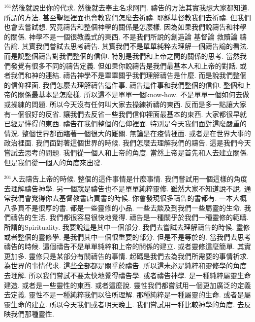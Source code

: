 \documentclass{book}
\begin{document}
$^{161}$然後就說出你的代求.
然後就去奉主名求阿門.
禱告的方法其實我想大家都知道.
所謂的方法.
甚至聖經裡面也會教我們怎麼去祈禱.
耶穌基督教我們去祈禱.
但我們也會去嘗試想.
究竟禱告和整個神學的關係是怎麼樣.
因為如果我們說禱告和神學的關係.
神學不是一個很教義式的東西.
不是我們所說的創造論 基督論 救贖論 禱告論.
其實我們嘗試去思考禱告.
其實我們不是單單純粹去理解一個禱告論的看法.
而是說整個禱告對我們整個的信仰.
特別是我們和上帝之間的關係的思考.
當然我們發覺有很多不同的禱告定義.
但如果你說禱告是我們最基本人和上帝的對話.
或者我們和神的連結.
禱告神學不是單單關乎我們理解禱告是什麼.
而是說我們整個的信仰裡面.
我們怎麼去理解禱告這件事.
禱告這件事和我們整個的信仰.
整個和上帝的關係最基本是怎麼樣.
所以這不是單單一個know-how.
不是單單一個如何去做或操練的問題.
所以今天沒有任何叫大家去操練祈禱的東西.
反而是多一點讓大家有一個很好的反省.
讓我們去反省一些我們信仰裡面最基本的東西.
大家都很早就已經是懂得的東西.
禱告在我們整個的信仰裡面.
特別是今天我們面對這麼嚴重的情況.
整個世界都面臨著一個很大的難關.
無論是在疫情裡面.
或者是在世界大事的政治裡面.
我們面對著這個世界的時候.
我們怎麼去理解我們的禱告.
這是我們今天嘗試去思考的問題.
我們從一個人和上帝的角度.
當然上帝是首先和人去建立關係.
但是我們從一個人的角度來出發.

$^{201}$人去禱告上帝的時候.
整個的這件事情是什麼事情.
我們嘗試用一個這樣的角度去理解禱告神學.
另一個就是禱告也不是單單純粹靈修.
雖然大家不知道說不說.
通常我們會覺得你去基督教書店買書的時候.
你會發現很多禱告的書都有.
一本大概八多頁不是很厚的書.
都是一些靈修的小品.
一些去談及到我們一些屬靈的生命.
我們禱告的生活.
我們都很容易很快地覺得.
禱告是一種關乎於我們一種靈修的範疇.
所謂的Spirituality.
我要說這是其中一個部分.
我們去嘗試去理解禱告的時候.
靈修或者整個的靈修學.
是我們其中一個很重要的部分.
但是不是等於的.
當我們去思考禱告的時候.
這個禱告不是單單純粹和上帝的關係的建立.
或者靈修這麼簡單.
其實更加多.
靈修只是某部分有關禱告的事情.
起碼是我們去為我們所需要的事情祈求.
為世界的事情代求.
這些全部都是關乎於禱告.
所以這未必是純粹和靈修學的角度去理解.
所以我們嘗試不要太快地覺得禱告學.
或者禱告神學.
是一種純粹屬靈生命建造.
或者是一些靈性的東西.
或者這麼說.
靈性我們都嘗試用一個更加廣泛的定義去定義.
靈性不是一種純粹我們以往所理解.
那種純粹是一種屬靈的生命.
或者是屬靈生命的建立.
所以今天我們或者明天晚上.
我們嘗試用一種比較神學的角度.
去反映我們那種靈性.
\end{document}
